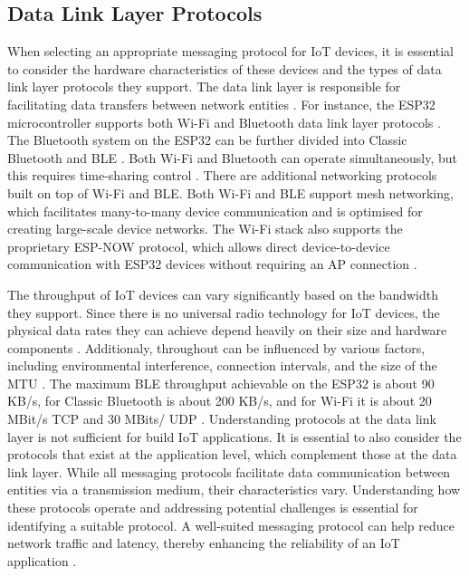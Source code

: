 \subsection{Data Link Layer Protocols}
When selecting an appropriate messaging protocol for \ac{IoT} devices, it is essential to consider the hardware characteristics of these devices and the types of data link layer protocols they support. The data link layer is responsible for facilitating data transfers between network entities \cite[1-3]{protocols}. For instance, the ESP32 microcontroller supports both Wi-Fi and Bluetooth data link layer protocols \cite{esp-prog}. The Bluetooth system on the ESP32 can be further divided into Classic Bluetooth and \ac{BLE} \cite{esp-prog} \cite{esp-faq}. Both Wi-Fi and Bluetooth can operate simultaneously, but this requires time-sharing control \cite[77]{esp-faq}. There are additional networking protocols built on top of Wi-Fi and \ac{BLE}. Both Wi-Fi and \ac{BLE} support mesh networking, which facilitates many-to-many device communication and is optimised for creating large-scale device networks. The Wi-Fi stack also supports the proprietary ESP-NOW protocol, which allows direct device-to-device communication with ESP32 devices without requiring an \ac{AP} connection \cite{esp-prog}.

The throughput of \ac{IoT} devices can vary significantly based on the bandwidth they support. Since there is no universal radio technology for \ac{IoT} devices, the physical data rates they can achieve depend heavily on their size and hardware components \cite[1-2]{protocols}. Additionaly, throughout can be influenced by various factors, including environmental interference, connection intervals, and the size of the \ac{MTU} \cite{esp-faq}. The maximum \ac{BLE} throughput achievable on the ESP32 is about 90 KB/s, for Classic Bluetooth is about 200 KB/s, and for Wi-Fi it is about 20 MBit/s TCP and 30 MBits/ UDP \cite[38, 58,71]{esp-faq} \cite[2666]{esp-prog}. Understanding protocols at the data link layer is not sufficient for build \ac{IoT} applications. It is essential to also consider the protocols that exist at the application level, which complement those at the data link layer. While all messaging protocols facilitate data communication between entities via a transmission medium, their characteristics vary. Understanding how these protocols operate and addressing potential challenges is essential for identifying a suitable protocol. A well-suited messaging protocol can help reduce network traffic and latency, thereby enhancing the reliability of an \ac{IoT} application \cite[2,15]{protocols}. 

